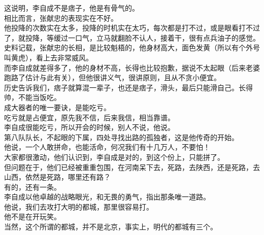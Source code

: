 \begin{multicols}{\theparacolNo}
这说明，李自成不是痞子，他是有骨气的。\\

相比而言，张献忠的表现实在不好。\\

他投降的次数实在太多，投降的时机实在太巧，每次都是打不过，或是眼看打不过了，就投降，等缓过一口气，立马就翻脸不认人，接着干，很有点兵油子的感觉。\\

史料记载，张献忠的长相，是比较魁梧的，他身材高大，面色发黄（所以有个外号叫黄虎），看上去非常威风。\\

而李自成就差得多了，他的身材不高，长得也比较抱歉，据说不太起眼（后来老婆跑路了估计与此有关），但他很讲义气，很讲原则，且从不贪小便宜。\\

历史告诉我们，痞子就算混一辈子，也还是痞子，滑头，最后只能滑自己。长得帅，不能当饭吃。\\

成大器者的唯一要诀，是能吃亏。\\

吃亏就是占便宜，原先我不信，后来我信，相当靠谱。\\

李自成很能吃亏，所以开会的时候，别人不说，他说。\\

第八队队长，不起眼的下属，四处寻找出路的孤独者，这是他传奇的开始。\\

他说，一个人敢拼命，也能活命，何况我们有十几万人，不要怕！\\

大家都很激动，他们认识到，李自成是对的，到这个份上，只能拼了。\\

但问题在于，他们已经被重重包围，在河南呆下去，死路，去陕西，还是死路，去山西，依然是死路，哪里还有路？\\

有的，还有一条。\\

李自成以他卓越的战略眼光，和无畏的勇气，指出那条唯一道路。\\

他说，我们去攻打大明的都城，那里很容易打。\\

他不是在开玩笑。\\

当然，这个所谓的都城，并不是北京，事实上，明代的都城有三个。\\


\end{multicols}
